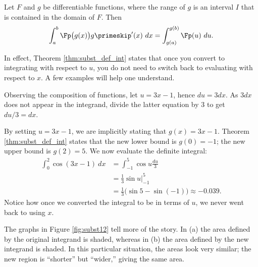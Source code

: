 {Let $F$ and $g$ be differentiable functions, where the range of $g$ is an interval $I$ that is contained in the domain of $F$. Then 
$$\int_a^b \Fp\big(g(x)\big)g\primeskip'(x)\ dx = \int_{g(a)}^{g(b)} \Fp(u)\ du.$$
}

In effect, Theorem \ref{thm:subst_def_int} states that once you convert to integrating with respect to $u$, you do not need to switch back to evaluating with respect to $x$. A few examples will help one understand.\\

{Observing the composition of functions, let $u=3x-1$, hence $du = 3dx$. As $3dx$ does not appear in the integrand, divide the latter equation by 3 to get $du/3 = dx$. 

By setting $u = 3x-1$, we are implicitly stating that $g(x) = 3x-1$. Theorem \ref{thm:subst_def_int} states that the new lower bound is $g(0) = -1$; the new upper bound is $g(2) = 5$. We now evaluate the definite integral:
\begin{align*}
\int_0^2 \cos(3x-1) \ dx &=	\int_{-1}^5 \cos u \frac{du}{3} \\
								&= \frac{1}{3} \sin u\Big|_{-1}^5 \\
								&= \frac{1}{3}\big(\sin 5- \sin (-1)\big)\approx -0.039.
\end{align*}
Notice how once we converted the integral to be in terms of $u$, we never went back to using $x$.

{%
}%
{%
}%

The graphs in Figure \ref{fig:subst12} tell more of the story. In (a) the area defined by the original integrand is shaded, whereas in (b) the area defined by the new integrand is shaded. In this particular situation, the areas look very similar; the new region is ``shorter'' but ``wider,'' giving the same area.
}\\

